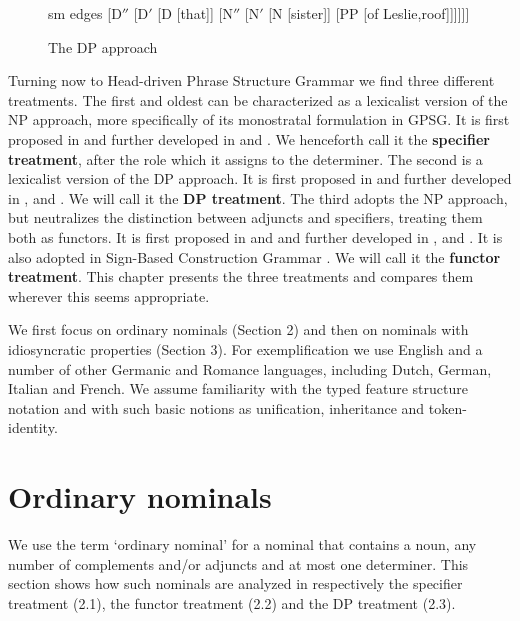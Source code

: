 \documentclass[output=paper]{langsci/langscibook}
\begin{document}
\begin{figure}
	\centering
	\begin{forest}
sm edges
[D$''$ 
	[D$'$
		[D [that]]
		[N$''$
			[N$'$ 
				[N [sister]]
				[PP [of Leslie,roof]]]]]]
	\end{forest}
	\caption{\label{abn} The DP approach } 
\end{figure}
     
Turning now to Head-driven Phrase Structure Grammar we find three different treatments.  
The first and oldest can be characterized as a lexicalist version of the NP approach, more 
specifically of its monostratal formulation in GPSG.  
It is first proposed in \citet{ps} and further developed in \citet{ps2} and 
\citet{GS00}. We henceforth call it the {\bf specifier treatment}, 
after the role which it assigns to the determiner. 
The second is a lexicalist version of the DP approach.  
It is first proposed in \citet{Netter94} and further developed in \citet{Netter96a},
and \citet{NerbonneMullen00}. We will call it the {\bf DP treatment}. 
The third adopts the NP approach, but neutralizes the distinction between adjuncts and specifiers, 
treating them both as functors. It is first proposed in \citet{VanEynde98a} and 
\citet{Allegranza98} and further developed in \citet{VanEynde03}, \citet{VanEynde06} 
and \citet{Allegranza06}. It is also adopted in Sign-Based Construction Grammar \citep{Sag2012}. 
We will call it the {\bf functor treatment}. This chapter presents the three treatments and 
compares them wherever this seems appropriate.  

We first focus on ordinary nominals (Section 2) and then on nominals with idiosyncratic 
properties (Section 3). For exemplification we use English and a number of other Germanic 
and Romance languages, including Dutch, German, Italian and French.  
We assume familiarity with the typed feature structure notation and with such basic notions 
as unification, inheritance and token-identity. 
    

\section{Ordinary nominals} 


We use the term `ordinary nominal' for a nominal that contains a noun, 
any number of complements and/or adjuncts and at most one determiner. 
This section shows how such nominals are analyzed in respectively the 
specifier treatment (2.1), the functor treatment (2.2) and the DP treatment (2.3).  
\end{document}
